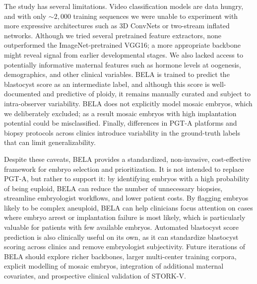 \documentclass[11pt,a4paper]{article}
\begin{document}
The study has several limitations. Video classification models are data
hungry, and with only $\sim2{,}000$ training sequences we were unable to
experiment with more expressive architectures such as 3D ConvNets or
two-stream inflated networks. Although we tried several pretrained
feature extractors, none outperformed the ImageNet-pretrained VGG16; a
more appropriate backbone might reveal signal from earlier developmental
stages. We also lacked access to potentially informative maternal
features such as hormone levels at oogenesis, demographics, and other
clinical variables. BELA is trained to predict the blastocyst score as
an intermediate label, and although this score is well-documented and
predictive of ploidy, it remains manually curated and subject to
intra-observer variability. BELA does not explicitly model mosaic
embryos, which we deliberately excluded; as a result mosaic embryos with
high implantation potential could be misclassified. Finally, differences
in PGT-A platforms and biopsy protocols across clinics \cite{capalbo2022}
introduce variability in the ground-truth labels that can limit
generalizability.

Despite these caveats, BELA provides a standardized, non-invasive,
cost-effective framework for embryo selection and prioritization. It is
not intended to replace PGT-A, but rather to support it: by identifying
embryos with a high probability of being euploid, BELA can reduce the
number of unnecessary biopsies, streamline embryologist workflows, and
lower patient costs. By flagging embryos likely to be complex aneuploid,
BELA can help clinicians focus attention on cases where embryo arrest or
implantation failure is most likely, which is particularly valuable for
patients with few available embryos. Automated blastocyst score
prediction is also clinically useful on its own, as it can standardize
blastocyst scoring across clinics and remove embryologist subjectivity.
Future iterations of BELA should explore richer backbones, larger
multi-center training corpora, explicit modelling of mosaic embryos,
integration of additional maternal covariates, and prospective clinical
validation of STORK-V.



\end{document}
